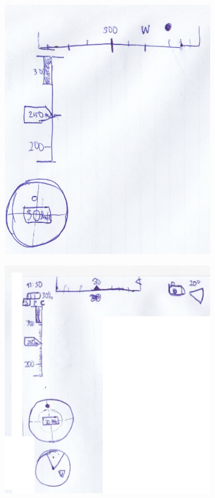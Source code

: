 \begin{figure}[H]
    \centering
    \begin{subfigure}[t]{0.46\linewidth}
        \centering
        \includegraphics[width=\linewidth]{obrazky-figures/navrh/staticHudWired.png}
    \end{subfigure}
    \hfill
    \begin{subfigure}[t]{0.53\linewidth}
        \centering
        \includegraphics[width=\linewidth]{obrazky-figures/navrh/staticHud2Wired.jpg}

\end{subfigure}
\end{figure}
